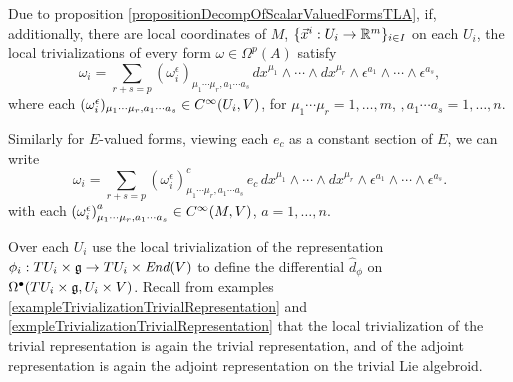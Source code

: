 \begin{remark} \label{remarkLocalDecompositionOfFormsOnTransitiveLieAlgebroidsIfTrivializationOfM} %
Due to proposition \ref{propositionDecompOfScalarValuedFormsTLA}, if, additionally, there are local coordinates of $M$, $\{\vec x^i: U_i \to \mathbb{R}^m\}_{i \in I}$ on each $U_i$, the local trivializations of every form $\omega \in \Omega^p(A)$ satisfy \begin{equation}
    \omega_i = \sum_{r + s = p} (\omega_i^\epsilon)_{\mu_1 \cdots \mu_r, a_1 \cdots a_s}\, dx^{\mu_1} \wedge \cdots \wedge dx^{\mu_r} \wedge \epsilon^{a_1} \wedge \cdots \wedge \epsilon^{a_s},
\end{equation}
where each $\lbtext{(\omega_i^\epsilon)_{\mu_1 \cdots \mu_r, a_1 \cdots a_s}} \in C^\infty(U_i, V)$, for $\mu_1 \cdots \mu_r = 1, \dots, m$, $, a_1 \cdots a_s = 1, \dots, n$. 

\noindent Similarly for $E$-valued forms, viewing each $e_c$ as a constant section of $E$, we can write
\begin{equation}
    \omega_i = \sum_{r + s = p} \left(\omega_i^\epsilon\right)^c_{\mu_1 \cdots \mu_r, a_1 \cdots a_s}\, e_c \, dx^{\mu_1} \wedge \cdots \wedge dx^{\mu_r} \wedge \epsilon^{a_1} \wedge \cdots \wedge \epsilon^{a_s}.
\end{equation} 
with each $\lbtext{\left(\omega_i^\epsilon\right)^a_{\mu_1 \cdots \mu_r, a_1 \cdots a_s}} \in C^\infty(M, V)$, $a = 1, \dots, n$.
\end{remark}

\begin{definition}
Over each $U_i$ use the local trivialization of the representation $\phi_i: TU_i\times \alg g \to TU_i \times \End(V)$ to define the differential $\hat d_\phi$ on $\Omega^\bullet(TU_i\times \mathfrak{g}, {U_i} \times V)$. Recall from examples \ref{exampleTrivializationTrivialRepresentation} and \ref{exmpleTrivializationTrivialRepresentation} that the local trivialization of the trivial representation is again the trivial representation, and of the adjoint representation is again the adjoint representation on the trivial Lie algebroid.
\end{definition}



